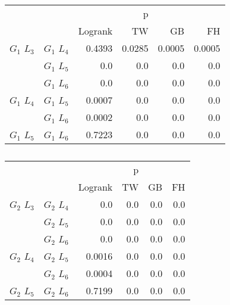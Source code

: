       \begin{table}[h!]
        \centering
        \begin{tabular}{llrrrr}
          \toprule
                       &             &         &  p &    &     \\
          \cmidrule{3-6}
                       &             & Logrank & TW & GB & FH  \\
          \midrule
          $G_1$ $L_3$  & $G_1$ $L_4$  &  0.4393 &  0.0285 &  0.0005 &  0.0005     \\
                       & $G_1$ $L_5$  & 0.0 & 0.0 & 0.0 & 0.0    \\
                       & $G_1$ $L_6$  & 0.0 & 0.0 & 0.0 & 0.0      \\
          $G_1$ $L_4$  & $G_1$ $L_5$  & 0.0007 & 0.0 & 0.0 & 0.0      \\
                       & $G_1$ $L_6$  & 0.0002 & 0.0 & 0.0 & 0.0       \\
          $G_1$ $L_5$   & $G_1$ $L_6$ & 0.7223 &  0.0 & 0.0 & 0.0      \\
          \bottomrule
        \end{tabular}
        \label{tab:g1_ingroup_tests_steps}
        \caption{}
      \end{table}


      \begin{table}[h!]
        \centering
        \begin{tabular}{llrrrr}
          \toprule
                       &             &         &  p &    &     \\
          \cmidrule{3-6}
                       &             & Logrank & TW & GB & FH  \\
          \midrule
          $G_2$ $L_3$  & $G_2$ $L_4$  &  0.0 &  0.0 &  0.0 &  0.0     \\
                       & $G_2$ $L_5$  & 0.0 & 0.0 & 0.0 & 0.0    \\
                       & $G_2$ $L_6$  & 0.0 & 0.0 & 0.0 & 0.0      \\
          $G_2$ $L_4$  & $G_2$ $L_5$  & 0.0016 & 0.0 & 0.0 & 0.0      \\
                       & $G_2$ $L_6$  & 0.0004 & 0.0 & 0.0 & 0.0       \\
          $G_2$ $L_5$   & $G_2$ $L_6$ & 0.7199 &  0.0 & 0.0 & 0.0      \\
          \bottomrule
        \end{tabular}
        \label{tab:g2_ingroup_tests_steps}
        \caption{}
      \end{table}


